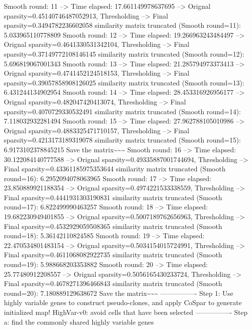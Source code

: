 \documentclass[letterpaper,10pt,english]{sphinxmanual}
\begin{document}
{\begin{sphinxVerbatim}[commandchars=\\\{\}]
Smooth round: 11
--> Time elapsed: 17.661149978637695
--> Orignal sparsity=0.45140746487052913, Thresholding
--> Final sparsity=0.3494782236602058
similarity matrix truncated (Smooth round=11):  5.033965110778809
Smooth round: 12
--> Time elapsed: 19.266963243484497
--> Orignal sparsity=0.4641330531342104, Thresholding
--> Final sparsity=0.37149772108146145
similarity matrix truncated (Smooth round=12):  5.696819067001343
Smooth round: 13
--> Time elapsed: 21.285794973373413
--> Orignal sparsity=0.4741452124518153, Thresholding
--> Final sparsity=0.39057858908126025
similarity matrix truncated (Smooth round=13):  6.431244134902954
Smooth round: 14
--> Time elapsed: 28.453316926956177
--> Orignal sparsity=0.482047420413074, Thresholding
--> Final sparsity=0.4070729330532491
similarity matrix truncated (Smooth round=14):  7.118032932281494
Smooth round: 15
--> Time elapsed: 27.962788105010986
--> Orignal sparsity=0.4883325471710157, Thresholding
--> Final sparsity=0.4213173189319078
similarity matrix truncated (Smooth round=15):  6.9173102378845215
Save the matrix\textasciitilde{}\textasciitilde{}\textasciitilde{}
Smooth round: 16
--> Time elapsed: 30.122084140777588
--> Orignal sparsity=0.49335887001744694, Thresholding
--> Final sparsity=0.43361185975353644
similarity matrix truncated (Smooth round=16):  6.2952094078063965
Smooth round: 17
--> Time elapsed: 23.850889921188354
--> Orignal sparsity=0.4974221533338559, Thresholding
--> Final sparsity=0.4441931303190831
similarity matrix truncated (Smooth round=17):  6.822499990463257
Smooth round: 18
--> Time elapsed: 19.682230949401855
--> Orignal sparsity=0.5007189762656963, Thresholding
--> Final sparsity=0.4532929059508365
similarity matrix truncated (Smooth round=18):  5.36142110824585
Smooth round: 19
--> Time elapsed: 22.470534801483154
--> Orignal sparsity=0.5034154015724991, Thresholding
--> Final sparsity=0.4611068082922735
similarity matrix truncated (Smooth round=19):  5.988668203353882
Smooth round: 20
--> Time elapsed: 25.77480912208557
--> Orignal sparsity=0.5056165430233724, Thresholding
--> Final sparsity=0.4678271396466843
similarity matrix truncated (Smooth round=20):  7.180889129638672
Save the matrix\textasciitilde{}\textasciitilde{}\textasciitilde{}
----------------
Step 1: Use highly variable genes to construct pseudo-clones, and apply CoSpar to generate initialized map!
HighVar-v0: avoid cells that have been selected
----------------
Step a: find the commonly shared highly variable genes
\end{sphinxVerbatim}
}
\end{document}
